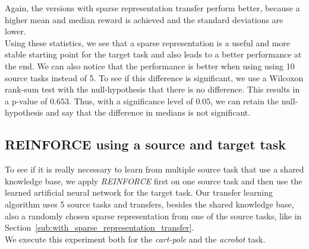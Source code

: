 Again, the versions with sparse representation transfer perform better, because a higher mean and median reward is achieved and the standard deviations are lower.\\
Using these statistics, we see that a sparse representation is a useful and more stable starting point for the target task and also leads to a better performance at the end.
We can also notice that the performance is better when using using 10 source tasks instead of 5. To see if this difference is significant, we use a Wilcoxon rank-sum test with the null-hypothesis that there is no difference. This results in a p-value of $0.653$. Thus, with a significance level of $0.05$, we can retain the null-hypothesis and say that the difference in medians is not significant.

\subsection{REINFORCE using a source and target task} %
\label{sub:reinforce_using_a_source_and_target_task}
To see if it is really necessary to learn from multiple source task that use a shared knowledge base, we apply \textit{REINFORCE} first on one source task and then use the learned artificial neural network for the target task. Our transfer learning algorithm uses 5 source tasks and transfers, besides the shared knowledge base, also a randomly chosen sparse representation from one of the source tasks, like in Section~\ref{sub:with_sparse_representation_transfer}.\\
We execute this experiment both for the \textit{cart-pole} and the \textit{acrobot} task.

